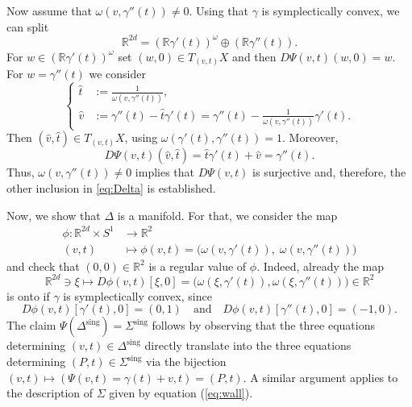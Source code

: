 \documentclass[12pt]{article}
\newcommand{\g}{{\gamma}}
\newcommand{\R}{{\mathbb R}}
\begin{document}
Now assume that $\omega(v,\gamma''(t))\neq0$. Using that $\gamma$ is symplectically convex, we can split 
$$
\R^{2d}=(\R\gamma'(t))^\omega\oplus(\R\gamma''(t)).
$$
For $w\in (\R\gamma'(t))^\omega$ set $(w,0)\in T_{(v,t)}X$ and then $D\Psi(v,t)(w,0)=w$. For $w=\gamma''(t)$ we consider
\begin{equation}\nonumber
\left\{
\begin{aligned}
\hat t&:=\frac{1}{\omega(v,\gamma''(t))},\\
\hat v&:=\gamma''(t)-\hat t\gamma'(t)=\gamma''(t)-\frac{1}{\omega(v,\gamma''(t))}\gamma'(t).
\end{aligned}
\right.
\end{equation}
Then $(\hat v,\hat t)\in T_{(v,t)}X$, using $\omega(\g'(t),\g''(t))=1$. Moreover, 
\begin{equation}\nonumber
D\Psi(v,t)(\hat v,\hat t)=\hat t\gamma'(t)+\hat v=\gamma''(t).
\end{equation}
Thus, $\omega(v,\gamma''(t))\neq0$ implies that $D\Psi(v,t)$ is surjective and, therefore, the other inclusion in \eqref{eq:Delta} is established.

Now, we show that $\Delta$ is a manifold. For that, we consider the map 
\begin{equation}\nonumber
\begin{aligned}
\phi: \R^{2d}\times S^1 &\to \R^2\\
(v,t)&\mapsto\phi(v,t)= \big(\omega(v,\gamma'(t)),\;\omega(v,\gamma''(t))\big)
\end{aligned}
\end{equation}
and check that $(0,0)\in\R^2$ is a regular value of $\phi$. Indeed, already the map
\begin{equation}\nonumber
\R^{2d}\ni\xi\mapsto D\phi(v,t)[\xi,0]=\big(\omega(\xi,\gamma'(t)),\omega(\xi,\gamma''(t))\big)\in\R^2
\end{equation}
is onto if $\gamma$ is symplectically convex, since
\begin{equation}\nonumber
D\phi(v,t)[\gamma'(t),0]=(0,1)\quad\text{and}\quad D\phi(v,t)[\gamma''(t),0]=(-1,0).
\end{equation}
The claim $\Psi(\Delta^{\mathrm{sing}})=\Sigma^{\mathrm{sing}}$ follows by observing that the three equations determining $(v,t)\in\Delta^{\mathrm{sing}}$ directly translate into the three equations determining $(P,t)\in\Sigma^{\mathrm{sing}}$ via the bijection $(v,t)\mapsto (\Psi(v,t)=\gamma(t)+v,t)=(P,t)$. A similar argument applies to the description of $\Sigma$ given by equation (\ref{eq:wall}).
\end{document}

